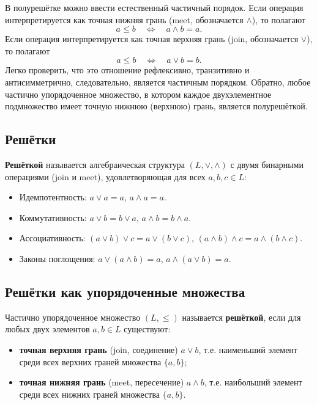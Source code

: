 \documentclass[10pt]{article}
\begin{document}
\begin{remark}
В полурешётке можно ввести естественный частичный порядок. Если операция интерпретируется как точная нижняя грань (meet, обозначается $\wedge$), то полагают
$$a \le b \quad \Longleftrightarrow \quad a \wedge b = a.$$
Если операция интерпретируется как точная верхняя грань (join, обозначается $\vee$), то полагают
$$a \le b \quad \Longleftrightarrow \quad a \vee b = b.$$
Легко проверить, что это отношение рефлексивно, транзитивно и антисимметрично, следовательно, является частичным порядком. Обратно, любое частично упорядоченное множество, в котором каждое двухэлементное подмножество имеет точную нижнюю (верхнюю) грань, является полурешёткой.
\end{remark}

\subsection{Решётки}
\begin{definition}
\textbf{Решёткой} называется алгебраическая структура $(L, \vee, \wedge)$ с двумя бинарными операциями (join и meet), удовлетворяющая для всех $a,b,c \in L$:
\begin{itemize}
    \item Идемпотентность: $a \vee a = a$, $a \wedge a = a$.
    \item Коммутативность: $a \vee b = b \vee a$, $a \wedge b = b \wedge a$.
    \item Ассоциативность: $(a \vee b) \vee c = a \vee (b \vee c)$, $(a \wedge b) \wedge c = a \wedge (b \wedge c)$.
    \item Законы поглощения: $a \vee (a \wedge b) = a$, $a \wedge (a \vee b) = a$.
\end{itemize}
\end{definition}

\subsection{Решётки как упорядоченные множества}
\begin{definition}
Частично упорядоченное множество $(L, \le)$ называется \textbf{решёткой}, если для любых двух элементов $a, b \in L$ существуют:
\begin{itemize}
    \item \textbf{точная верхняя грань} (join, соединение) $a \vee b$, т.е. наименьший элемент среди всех верхних граней множества $\{a,b\}$;
    \item \textbf{точная нижняя грань} (meet, пересечение) $a \wedge b$, т.е. наибольший элемент среди всех нижних граней множества $\{a,b\}$.
\end{itemize}
\end{definition}
\end{document}
